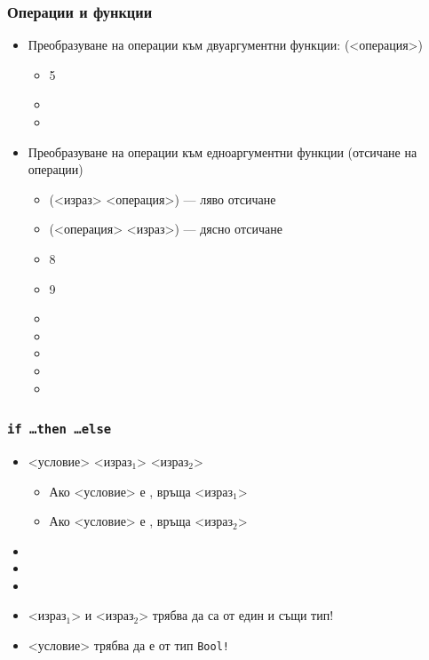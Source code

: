 \documentclass[alsotrans,beameroptions={aspectratio=169}]{beamerswitch}
\begin{document}
\begin{frame}
  \frametitle{Операции и функции}
  \begin{itemize}[<+->]
  \item Преобразуване на операции към двуаргументни функции: \tta(<операция>\tta)
    \begin{itemize}
    \item {}5
    \item {}
    \item {}
    \end{itemize}
  \item Преобразуване на операции към едноаргументни функции (отсичане на операции)
    \begin{itemize}
    \item \tta(<израз> <операция>\tta) --- ляво отсичане
    \item \tta(<операция> <израз>\tta) --- дясно отсичане
    \item {}8
    \item {}9
    \item {}
    \item {}
    \item {}
    \item {}
    \item {}
    \end{itemize}
  \end{itemize}
\end{frame}

\begin{frame}
  \frametitle{\tt{if} \ldots \tt{then} \ldots \tt{else}}
  \begin{itemize}[<+->]
  \item {} <условие>  <израз$_1$>  <израз$_2$>
    \begin{itemize}[<.->]
    \item Ако <условие> е , връща <израз$_1$>
    \item Ако <условие> е , връща <израз$_2$>
    \end{itemize}
  \item {}
  \item {}
  \item {}
  \item \alert{<израз$_1$> и <израз$_2$> трябва да са от един и същи тип!}
  \item \alert{<условие> трябва да е от тип \tt{Bool}!}
  \end{itemize}
\end{frame}
\end{document}
